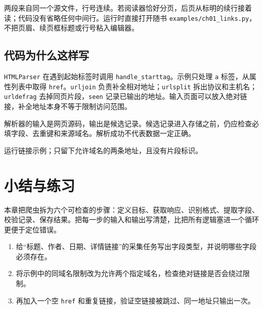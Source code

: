 \noindent 两段来自同一个源文件，行号连续。若阅读器恰好分页，后页从标明的续行接着读；代码没有省略任何中间行。运行时直接打开随书 \texttt{examples/ch01\_links.py}，不把页眉、续页框标题或行号粘入编辑器。
\subsection{代码为什么这样写}
\texttt{HTMLParser} 在遇到起始标签时调用 \texttt{handle\_starttag}。示例只处理 \texttt{a} 标签，从属性列表中取得 \texttt{href}。\texttt{urljoin} 负责补全相对地址；\texttt{urlsplit} 拆出协议和主机名；\texttt{urldefrag} 去掉同页片段，\texttt{seen} 记录已输出的地址。输入页面可以放入绝对链接，补全地址本身不等于限制访问范围。

\begin{examtip}
解析器的输入是网页源码，输出是候选记录。候选记录进入存储之前，仍应检查必填字段、去重键和来源域名。解析成功不代表数据一定正确。
\end{examtip}

\begin{tcolorbox}[title=本章验收,colframe=Teal,colback=Teal!3]
运行链接示例；只留下允许域名的两条地址，且没有片段标识。
\end{tcolorbox}

\section{小结与练习}\label{sec:workflow:exercise}
本章把爬虫拆为六个可检查的步骤：定义目标、获取响应、识别格式、提取字段、校验记录、保存结果。把每一步的输入和输出写清楚，比把所有逻辑塞进一个循环更便于定位错误。

\begin{enumerate}[label=\arabic*.]
\item 给“标题、作者、日期、详情链接”的采集任务写出字段类型，并说明哪些字段必须存在。
\item 将示例中的同域名限制改为允许两个指定域名，检查绝对链接是否会绕过限制。
\item 再加入一个空 \texttt{href} 和重复链接，验证空链接被跳过、同一地址只输出一次。
\end{enumerate}
